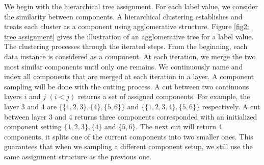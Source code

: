 We begin with the hierarchical tree assignment. For each label value, we consider the similarity between components. A hierarchical clustering establishes and treats each cluster as a component using agglomerative structure. Figure \ref{fig2: tree assignment} gives the illustration of an agglomerative tree for a label value. The clustering processes through the iterated steps. From the beginning, each data instance is considered as a component. At each iteration, we merge the two most similar components until only one remains. We continuously name and index all components that are merged at each iteration in a layer. A component sampling will be done with the cutting process. A cut between two continuous layers $i$ and $j$ $(i < j)$ returns a set of assigned components. For example, the layer 3 and 4 are $\{\{1,2,3\},\{4\},\{5,6\}\}$ and $\{\{1,2,3, 4\},\{5,6\}\}$ respectively. A cut between layer 3 and 4 returns three components corresponded with an initialized component setting $\{1,2,3\}, \{4\}$ and $\{5,6\}$. The next cut will return 4 components, it splits one of the current components into two smaller ones. This guarantees that when we sampling a different component setup, we still use the same assignment structure as the previous one.
